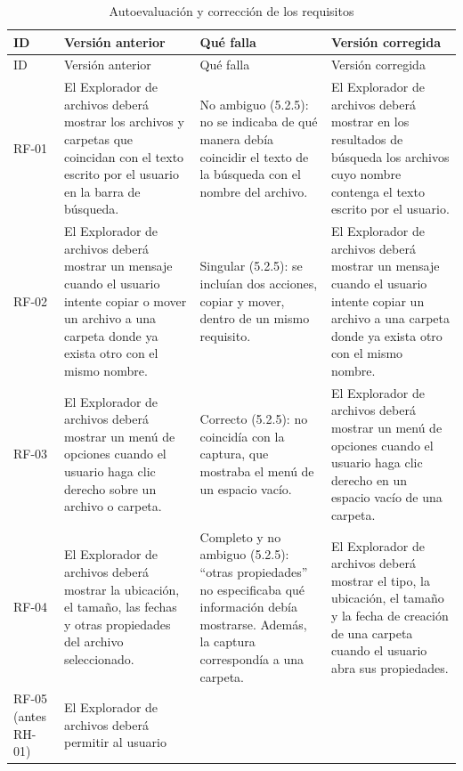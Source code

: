 \documentclass[10pt,a4paper]{article}
\begin{document}
{\small
\setlength{\tabcolsep}{2pt}
\renewcommand{\arraystretch}{1.03}

\begin{longtable}{%
>{\raggedright\arraybackslash}p{1cm}%
>{\raggedright\arraybackslash}p{4.8cm}%
>{\raggedright\arraybackslash}p{3.2cm}%
>{\raggedright\arraybackslash}p{5.3cm}%
}
\caption{Autoevaluación y corrección de los requisitos}
\label{tab:autoevaluacion}\\
\toprule
ID & Versión anterior & Qué falla & Versión corregida \\
\midrule
\endfirsthead
\toprule
ID & Versión anterior & Qué falla & Versión corregida \\
\midrule
\endhead
\bottomrule
\endfoot
RF-01 &
El Explorador de archivos deberá mostrar los archivos
y carpetas que coincidan con el texto escrito por el
usuario en la barra de búsqueda. &
No ambiguo (5.2.5): no se indicaba de qué manera
debía coincidir el texto de la búsqueda con el nombre
del archivo. &
El Explorador de archivos deberá mostrar en los resultados
de búsqueda los archivos cuyo nombre contenga el texto
escrito por el usuario. \\
\hline
RF-02 &
El Explorador de archivos deberá mostrar un mensaje
cuando el usuario intente copiar o mover un archivo
a una carpeta donde ya exista otro con el mismo nombre. &
Singular (5.2.5): se incluían dos acciones,
copiar y mover, dentro de un mismo requisito. &
El Explorador de archivos deberá mostrar un mensaje
cuando el usuario intente copiar un archivo a una carpeta
donde ya exista otro con el mismo nombre. \\
\hline
RF-03 &
El Explorador de archivos deberá mostrar un menú de
opciones cuando el usuario haga clic derecho sobre
un archivo o carpeta. &
Correcto (5.2.5): no coincidía con la captura,
que mostraba el menú de un espacio vacío. &
El Explorador de archivos deberá mostrar un menú
de opciones cuando el usuario haga clic derecho
en un espacio vacío de una carpeta. \\
\hline
RF-04 &
El Explorador de archivos deberá mostrar la ubicación,
el tamaño, las fechas y otras propiedades del archivo
seleccionado. &
Completo y no ambiguo (5.2.5):
\enquote{otras propiedades} no especificaba
qué información debía mostrarse.
Además, la captura correspondía a una carpeta. &
El Explorador de archivos deberá mostrar el tipo,
la ubicación, el tamaño y la fecha de creación
de una carpeta cuando el usuario abra sus propiedades. \\
\hline
RF-05
(antes RH-01) &
El Explorador de archivos deberá permitir al usuario

\end{longtable}}
\end{document}
